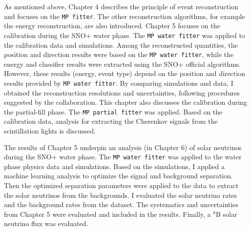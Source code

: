 As mentioned above, Chapter 4 describes the principle of event reconstruction and focuses on the \texttt{MP fitter}. The other reconstruction algorithms, for example the energy reconstruction, are also introduced. Chapter 5 focuses on the calibration during the SNO+ water phase. The \texttt{MP water fitter} was applied to the calibration data and simulations. Among the reconstructed quantities, the position and direction results were based on the \texttt{MP water fitter}, while the energy and classifier results were extracted using the SNO+ official algorithms. However, these results (energy, event type) depend on the position and direction results provided by \texttt{MP water fitter}. By comparing simulations and data, I obtained the reconstruction resolutions and uncertainties, following procedures suggested by the collaboration. This chapter also discusses the calibration during the partial-fill phase. The \texttt{MP partial fitter} was applied. Based on the calibration data, analysis for extracting the Cherenkov signals from the scintillation lights is discussed.

The results of Chapter 5 underpin an analysis (in Chapter 6) of solar neutrinos during the SNO+ water phase. The \texttt{MP water fitter} was applied to the water phase physics data and simulations. Based on the simulations, I applied a machine learning analysis to optimize the signal and background separation. Then the optimized separation parameters were applied to the data to extract the solar neutrinos from the backgrounds. I evaluated the solar neutrino rates and the background rates from the dataset. The systematics and uncertainties from Chapter 5 were evaluated and included in the results. Finally, a $^8$B solar neutrino flux was evaluated.
